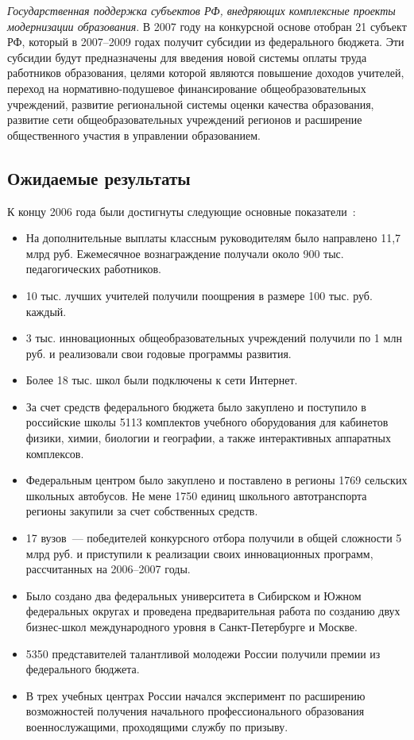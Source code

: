 \documentclass[article, 12pt, russian, oneside]{ncc}
\begin{document}
\emph{Государственная поддержка субъектов РФ, внедряющих комплексные
  проекты модернизации образования}. В 2007 году на конкурсной основе
отобран 21 субъект РФ, который в 2007--2009 годах получит субсидии из
федерального бюджета. Эти субсидии будут предназначены для введения
новой системы оплаты труда работников образования, целями которой
являются повышение доходов учителей, переход на нормативно-подушевое
финансирование общеобразовательных учреждений, развитие региональной
системы оценки качества образования, развитие сети общеобразовательных
учреждений регионов и расширение общественного участия в управлении
образованием.

\subsection{Ожидаемые результаты}

К концу 2006 года были достигнуты следующие основные
показатели~\cite{Edu_Waitings}:

\begin{itemize}
\item На дополнительные выплаты классным руководителям было направлено
  11,7 млрд руб. Ежемесячное вознаграждение получали около 900
  тыс. педагогических работников.
\item 10 тыс. лучших учителей получили поощрения в размере 100
  тыс. руб. каждый.
\item 3 тыс. инновационных общеобразовательных учреждений получили по
  1 млн руб. и реализовали свои годовые программы развития.
\item Более 18 тыс. школ были подключены к сети Интернет.
\item За счет средств федерального бюджета было закуплено и поступило
  в российские школы 5113 комплектов учебного оборудования для
  кабинетов физики, химии, биологии и географии, а также интерактивных
  аппаратных комплексов.
\item Федеральным центром было закуплено и поставлено в регионы 1769
  сельских школьных автобусов. Не мене 1750 единиц школьного
  автотранспорта регионы закупили за счет собственных средств.
\item 17 вузов~--- победителей конкурсного отбора получили в общей
  сложности 5 млрд руб. и приступили к реализации своих инновационных
  программ, рассчитанных на 2006--2007 годы.
\item Было создано два федеральных университета в Сибирском и Южном
  федеральных округах и проведена предварительная работа по созданию
  двух бизнес-школ международного уровня в Санкт-Петербурге и Москве.
\item 5350 представителей талантливой молодежи России получили премии
  из федерального бюджета.
\item В трех учебных центрах России начался эксперимент по расширению
  возможностей получения начального профессионального образования
  военнослужащими, проходящими службу по призыву.
\end{itemize}
\end{document}
